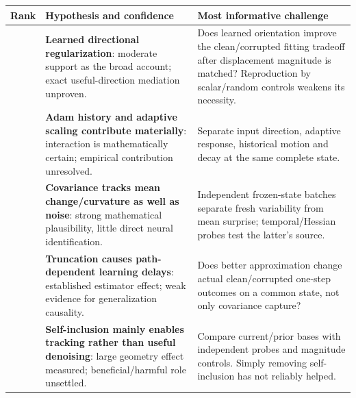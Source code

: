 \documentclass[
  british,
  10pt,
  a4paper,
]{article}
\newcounter{none} %
\begin{document}
{\def\LTcaptype{none} %
\begin{longtable}[]{@{}
  >{\raggedleft\arraybackslash}p{}
  >{\raggedright\arraybackslash}p{}
  >{\raggedright\arraybackslash}p{}@{}}
\toprule\noalign{}
\begin{minipage}[b]{\linewidth}\raggedleft
Rank
\end{minipage} & \begin{minipage}[b]{\linewidth}\raggedright
Hypothesis and confidence
\end{minipage} & \begin{minipage}[b]{\linewidth}\raggedright
Most informative challenge
\end{minipage} \\
\midrule\noalign{}
\endhead
\bottomrule\noalign{}
\endlastfoot
1 & \textbf{Learned directional regularization}: moderate support as the
broad account; exact useful-\allowbreak{}direction mediation unproven. &
Does learned orientation improve the clean/\allowbreak{}corrupted
fitting tradeoff after displacement magnitude is matched? Reproduction
by scalar/\allowbreak{}random controls weakens its necessity. \\
2 & \textbf{Adam history and adaptive scaling contribute materially}:
interaction is mathematically certain; empirical contribution
unresolved.\allowbreak{} & Separate input direction, adaptive response,
historical motion and decay at the same complete state. \\
3 & \textbf{Covariance tracks mean change/\allowbreak{}curvature as well
as noise}: strong mathematical plausibility\allowbreak{},\allowbreak{}
little direct neural identificati\allowbreak{}on.\allowbreak{} &
Independent frozen-\allowbreak{}state batches separate fresh variability
from mean surprise; temporal/\allowbreak{}Hessian probes test the
latter's source. \\
4 & \textbf{Truncation causes path-\allowbreak{}dependent learning
delays}: established estimator effect; weak evidence for generalization
causality. & Does better approximation change actual
clean/\allowbreak{}corrupted one-step outcomes on a common state, not
only covariance capture? \\
5 & \textbf{Self-\allowbreak{}inclusion mainly enables tracking rather
than useful denoising}: large geometry effect measured;
beneficial/\allowbreak{}harmful role unsettled. & Compare
current/\allowbreak{}prior bases with independent probes and magnitude
controls. Simply removing self-\allowbreak{}inclusion has not reliably
helped. \\
\end{longtable}
}
\end{document}
